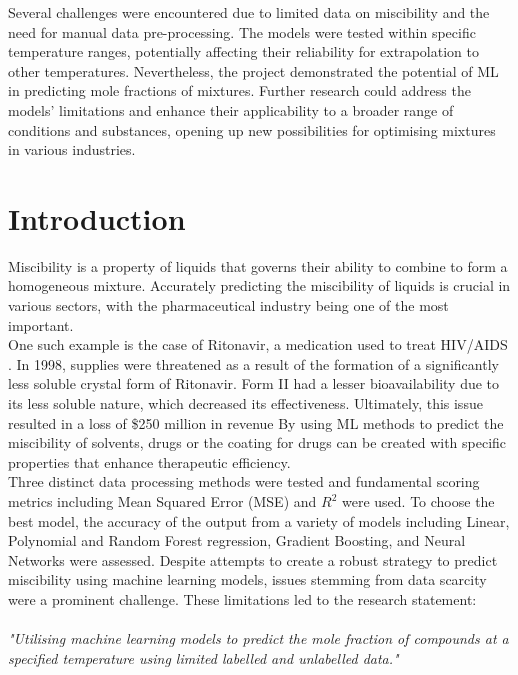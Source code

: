 \documentclass[11pt, titlepage]{article}
\begin{document}
Several challenges were encountered due to limited data on miscibility and the need for manual data pre-processing. The models were tested within specific temperature ranges, potentially affecting their reliability for extrapolation to other temperatures. Nevertheless, the project demonstrated the potential of ML in predicting mole fractions of mixtures. Further research could address the models' limitations and enhance their applicability to a broader range of conditions and substances, opening up new possibilities for optimising mixtures in various industries.

\section{Introduction}
\label{section:introduction}
Miscibility is a property of liquids that governs their ability to combine to form a homogeneous mixture. Accurately predicting the miscibility of liquids is crucial in various sectors, with the pharmaceutical industry being one of the most important.\\

One such example is the case of Ritonavir, a medication used to treat HIV/AIDS \cite{ritonavir}. In 1998, supplies were threatened as a result of the formation of a significantly less soluble crystal form of Ritonavir.  Form II had a lesser bioavailability due to its less soluble nature, which decreased its effectiveness. \cite{ritonavir2} Ultimately, this issue resulted in a loss of \$250 million in revenue \cite{ritonavir3}
By using ML methods to predict the miscibility of solvents, drugs or the coating for drugs can be created with specific properties that enhance therapeutic efficiency.\\

Three distinct data processing methods were tested and fundamental scoring metrics including Mean Squared Error (MSE) and $R^{2}$ were used. To choose the best model, the accuracy of the output from a variety of models including Linear, Polynomial and Random Forest regression, Gradient Boosting, and Neural Networks were assessed. Despite attempts to create a robust strategy to predict miscibility using machine learning models, issues stemming from data scarcity were a prominent challenge. These limitations led to the research statement:\\\\
\textit{"Utilising machine learning models to predict the mole fraction of compounds at a specified temperature using limited labelled and unlabelled data."}
\end{document}
